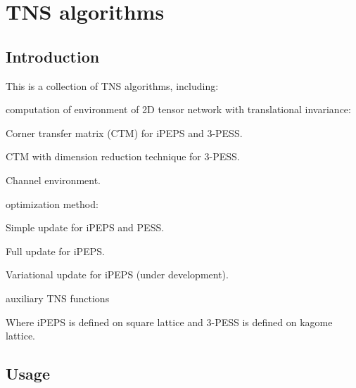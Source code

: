 \section*{T\+NS algorithms}

\subsection*{Introduction}

This is a collection of T\+NS algorithms, including\+:


\begin{DoxyItemize}
\item computation of environment of 2D tensor network with translational invariance\+:
\begin{DoxyItemize}
\item Corner transfer matrix (C\+TM) for i\+P\+E\+PS and 3-\/\+P\+E\+SS.
\item C\+TM with dimension reduction technique for 3-\/\+P\+E\+SS.
\item Channel environment.
\end{DoxyItemize}
\item optimization method\+:
\begin{DoxyItemize}
\item Simple update for i\+P\+E\+PS and P\+E\+SS.
\item Full update for i\+P\+E\+PS.
\item Variational update for i\+P\+E\+PS (under development).
\end{DoxyItemize}
\item auxiliary T\+NS functions
\end{DoxyItemize}

Where i\+P\+E\+PS is defined on square lattice and 3-\/\+P\+E\+SS is defined on kagome lattice.

\subsection*{Usage}


